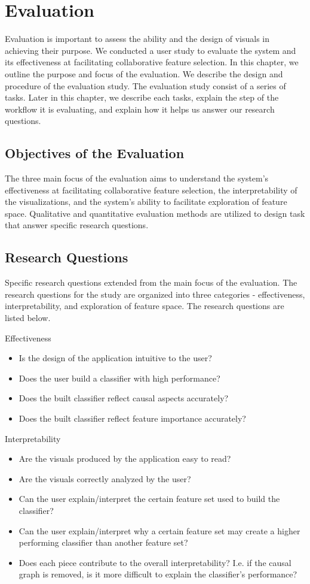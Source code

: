 \chapter{Evaluation}
Evaluation is important to assess the ability and the design of visuals in achieving their purpose. We conducted a user study to evaluate the system and its effectiveness at facilitating collaborative feature selection. In this chapter, we outline the purpose and focus of the evaluation. We describe the design and procedure of the evaluation study. The evaluation study consist of a series of tasks. Later in this chapter, we describe each tasks, explain the step of the workflow it is evaluating, and explain how it helps us answer our research questions.

\section{ Objectives of the Evaluation }
The three main focus of the evaluation aims to understand the system's effectiveness at facilitating collaborative feature selection, the interpretability of the visualizations, and the system's ability to facilitate exploration of feature space. Qualitative and quantitative evaluation methods are utilized to design task that answer specific research questions.

\section{Research Questions}
Specific research questions extended from the main focus of the evaluation. The research questions for the study are organized into three categories - effectiveness, interpretability, and exploration of feature space. The research questions are listed below.

Effectiveness
\begin{itemize}
\item{Is the design of the application intuitive to the user?}
\item{Does the user build a classifier with high performance?}
\item{Does the built classifier reflect causal aspects accurately?}
\item{Does the built classifier reflect feature importance accurately?}
\end{itemize}

Interpretability
\begin{itemize}
\item{Are the visuals produced by the application easy to read?}
\item{Are the visuals correctly analyzed by the user?}
\item{Can the user explain/interpret the certain feature set used to build the classifier? }
\item{Can the user explain/interpret why a certain feature set may create a higher performing classifier than another feature set?}
\item{Does each piece contribute to the overall interpretability? I.e. if the causal graph is removed, is it more difficult to explain the classifier’s performance?}
\end{itemize}

